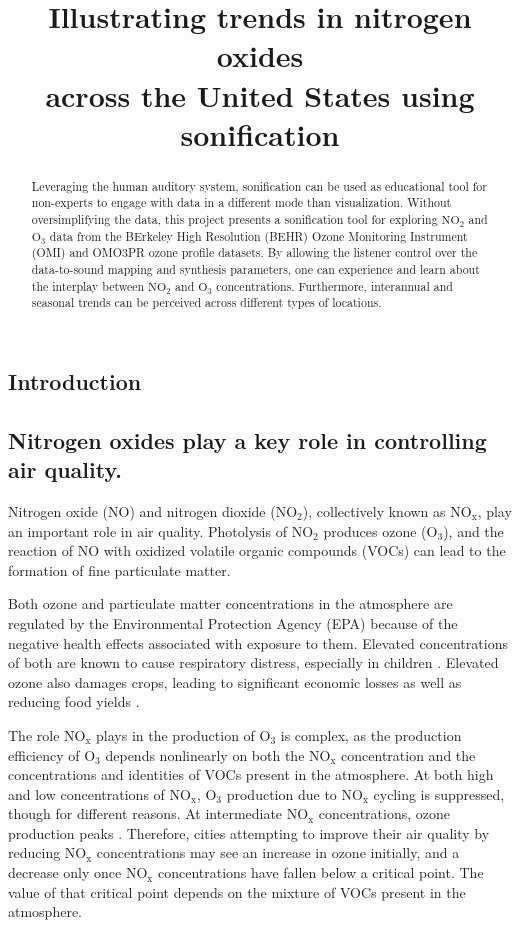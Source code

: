 \documentclass[a4paper,10pt,oneside]{article}
\title{Illustrating trends in nitrogen oxides \\across the United States using sonification}
\newcommand{\ce}[1]{$\mathrm{#1}$}
\begin{document}
\ninept
\maketitle

\begin{sloppy}

\begin{abstract}
    Leveraging the human auditory system, sonification can be used as educational tool for non-experts to engage with data in a different mode than visualization.  Without oversimplifying the data, this project presents a sonification tool for exploring \ce{NO_2} and \ce{O_3} data from the BErkeley High Resolution (BEHR) Ozone Monitoring Instrument (OMI) and OMO3PR ozone profile datasets.  By allowing the listener control over the data-to-sound mapping and synthesis parameters, one can experience and learn about the interplay between \ce{NO_2} and \ce{O_3} concentrations.  Furthermore, interannual and seasonal trends can be perceived across different types of locations. 
\end{abstract}

\section{Introduction}
\label{sec:intro}

\subsection{Nitrogen oxides play a key role in controlling air quality.}
\label{sec:nox-chemistry}
Nitrogen oxide (\ce{NO}) and nitrogen dioxide (\ce{NO_2}), collectively known as \ce{NO_x}, play an important role in air quality.  Photolysis of \ce{NO_2} produces ozone (\ce{O_3}), and the reaction of \ce{NO} with oxidized volatile organic compounds (VOCs) can lead to the formation of fine particulate matter.

Both ozone and particulate matter concentrations in the atmosphere are regulated by the Environmental Protection Agency (EPA) because of the negative health effects associated with exposure to them. Elevated concentrations of both are known to cause respiratory distress, especially in children \cite{romieu96}. Elevated ozone also damages crops, leading to significant economic losses as well as reducing food yields \cite{tai14}.

The role \ce{NO_x} plays in the production of \ce{O_3} is complex, as the production efficiency of \ce{O_3} depends nonlinearly on both the \ce{NO_x} concentration and the concentrations and identities of VOCs present in the atmosphere. At both high and low concentrations of \ce{NO_x}, \ce{O_3} production due to \ce{NO_x} cycling is suppressed, though for different reasons. At intermediate \ce{NO_x} concentrations, ozone production peaks \cite{murphy07}.  Therefore, cities attempting to improve their air quality by reducing \ce{NO_x} concentrations may see an increase in ozone initially, and a decrease only once \ce{NO_x} concentrations have fallen below a critical point. The value of that critical point depends on the mixture of VOCs present in the atmosphere.


\end{sloppy}
\end{document}
